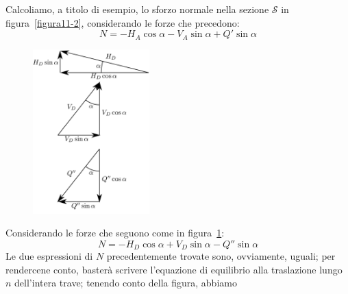 \noindent Calcoliamo, a titolo di esempio, lo sforzo normale nella sezione $\mathcal{S}$ in figura~\ref{figura11-2}, considerando le forze che precedono:
\begin{equation} \label{equazione11-1}
\boxed{ N = - H_{A} \cos{\alpha} - V_{A}\sin{\alpha} + Q'\sin{\alpha} } \tag{11.1}
\end{equation}
\renewcommand{\thefigure}{11~-~3}
\begin{figure}[ht]
\centering
\includegraphics[width=0.4\textwidth]{Immagini/Parte_11/Figura11_3/figura11_3.pdf}
\caption{}
\label{figura11-3}
\end{figure}
Considerando le forze che seguono come in figura~\ref{figura11-3}:
\begin{equation} \label{equazione11-2}
\boxed{ N = - H_{D} \cos{\alpha} + V_{D}\sin{\alpha} - Q''\sin{\alpha} } \tag{11.2}
\end{equation}
Le due espressioni di $N$ precedentemente trovate sono, ovviamente, uguali; per rendercene conto, basterà scrivere l'equazione di equilibrio alla traslazione lungo $n$ dell'intera trave; tenendo conto della figura, abbiamo

